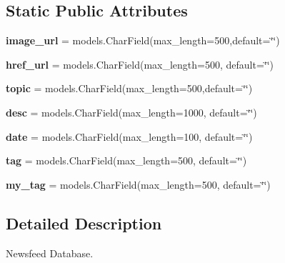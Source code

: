 \subsection*{Static Public Attributes}
\begin{DoxyCompactItemize}
\item 
\mbox{\label{classindex_1_1models_1_1News__feed_a490a5c0135b542d873d4ab0da0340506}} 
{\bfseries image\+\_\+url} = models.\+Char\+Field(max\+\_\+length=500,default=\char`\"{}\char`\"{})
\item 
\mbox{\label{classindex_1_1models_1_1News__feed_a465d0f79cf259660ce283fd3445ce667}} 
{\bfseries href\+\_\+url} = models.\+Char\+Field(max\+\_\+length=500, default=\char`\"{}\char`\"{})
\item 
\mbox{\label{classindex_1_1models_1_1News__feed_ad506cc6b127968f293f5dd3592330f77}} 
{\bfseries topic} = models.\+Char\+Field(max\+\_\+length=500,default=\char`\"{}\char`\"{})
\item 
\mbox{\label{classindex_1_1models_1_1News__feed_a62a5bf450f99aa88a652a014fff2c368}} 
{\bfseries desc} = models.\+Char\+Field(max\+\_\+length=1000, default=\char`\"{}\char`\"{})
\item 
\mbox{\label{classindex_1_1models_1_1News__feed_abd3f9fe867b45b7ddf15f711e44b84f8}} 
{\bfseries date} = models.\+Char\+Field(max\+\_\+length=100, default=\char`\"{}\char`\"{})
\item 
\mbox{\label{classindex_1_1models_1_1News__feed_a15f64962a1a224f98c2e9f4e620ecb2d}} 
{\bfseries tag} = models.\+Char\+Field(max\+\_\+length=500, default=\char`\"{}\char`\"{})
\item 
\mbox{\label{classindex_1_1models_1_1News__feed_af4fe19839f5aca914972adb57238d27a}} 
{\bfseries my\+\_\+tag} = models.\+Char\+Field(max\+\_\+length=500, default=\char`\"{}\char`\"{})
\end{DoxyCompactItemize}


\subsection{Detailed Description}
Newsfeed Database. 

